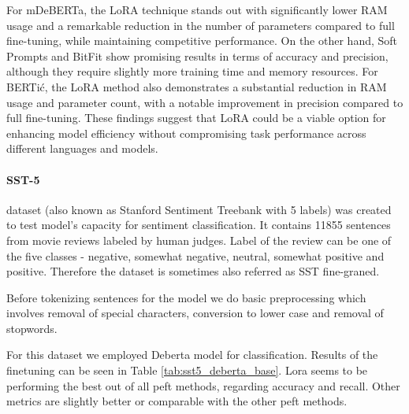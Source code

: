 For mDeBERTa, the LoRA technique stands out with significantly lower RAM usage and a remarkable reduction in the number of parameters compared to full fine-tuning, while maintaining competitive performance. On the other hand, Soft Prompts and BitFit show promising results in terms of accuracy and precision, although they require slightly more training time and memory resources. For BERTić, the LoRA method also demonstrates a substantial reduction in RAM usage and parameter count, with a notable improvement in precision compared to full fine-tuning. These findings suggest that LoRA could be a viable option for enhancing model efficiency without compromising task performance across different languages and models.

\paragraph{SST-5} dataset (also known as Stanford Sentiment Treebank with 5 labels) was created to test model's capacity for sentiment classification. It contains 11855 sentences from movie reviews labeled by human judges. Label of the review can be one of the five classes - negative, somewhat negative, neutral, somewhat positive and positive. Therefore the dataset is sometimes also referred as SST fine-graned. 

Before tokenizing sentences for the model we do basic preprocessing which involves removal of special characters, conversion to lower case and removal of stopwords.

For this dataset we employed Deberta model for classification. Results of the finetuning can be seen in Table \ref{tab:sst5_deberta_base}. Lora seems to be performing the best out of all peft methods, regarding accuracy and recall. Other metrics are slightly better or comparable with the other peft methods.

\begin{table}[htbp]
  \centering
    \caption{Performance of Full Finetuning vs PEFT methods on SST5 for mDEBERTA-base}
    \label{tab:sst5_deberta_base}
\end{table}